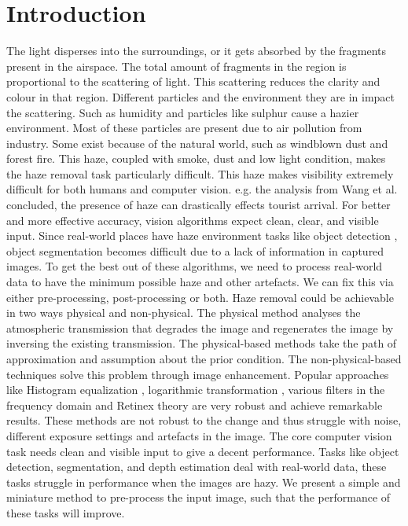 \section{Introduction}
\label{introduction}
The light disperses into the surroundings, or it gets absorbed by the fragments present in the airspace. The total amount of fragments in the region is proportional to the scattering of light. This scattering reduces the clarity and colour in that region. Different particles and the environment they are in impact the scattering. Such as humidity and particles like sulphur cause a hazier environment. Most of these particles are present due to air pollution from industry. Some exist because of the natural world, such as windblown dust and forest fire. This haze, coupled with smoke, dust and low light condition, makes the haze removal task particularly difficult. This haze makes visibility extremely difficult for both humans and computer vision. e.g. the analysis from Wang et al. \cite{tourist}  concluded, the presence of haze can drastically effects tourist arrival. For better and more effective accuracy, vision algorithms expect clean, clear, and visible input. Since real-world places have haze environment tasks like object detection \cite{obj_det_cnn}, object segmentation \cite{motion_seg_cnn} becomes difficult due to a lack of information in captured images. To get the best out of these algorithms, we need to process real-world data to have the minimum possible haze and other artefacts. We can fix this via either pre-processing,  post-processing or both. Haze removal could be achievable in two ways physical and non-physical. The physical method analyses the atmospheric transmission that degrades the image and regenerates the image by inversing the existing transmission. The physical-based methods take the path of approximation and assumption about the prior condition. The non-physical-based techniques solve this problem through image enhancement. Popular approaches like Histogram equalization \cite{lai}, logarithmic transformation \cite{multi_sc}, various filters \cite{filters, pol_fil_sc, pol_filter2, prior_filt} in the frequency domain and Retinex theory \cite{retinex} are very robust and achieve remarkable results. These methods are not robust to the change and thus struggle with noise, different exposure settings and artefacts in the image. The core computer vision task needs clean and visible input to give a decent performance. Tasks like object detection, segmentation, and depth estimation deal with real-world data, these tasks struggle in performance when the images are hazy. We present a simple and miniature method to pre-process the input image, such that the performance of these tasks will improve.
